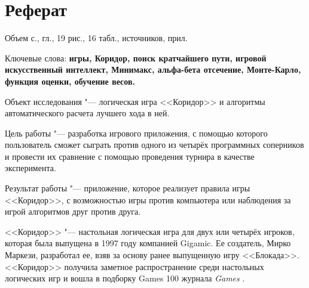 \documentclass[a4paper,12pt]{diplom}
\begin{document}

\maketitle

\chapter*{Реферат}

Объем  с.,  гл., 19 рис.,
16 табл.,  источников,  прил.

\medskip

Ключевые слова: \textbf{игры, Коридор, поиск кратчайшего пути, игровой искусственный интеллект, Минимакс, альфа-бета отсечение, Монте-Карло, функция оценки, обучение весов.}

\medskip

Объект исследования "--- логическая игра <<Коридор>> и алгоритмы автоматического расчета лучшего хода в ней.

Цель работы "--- разработка игрового приложения, с помощью которого пользователь сможет сыграть против одного из четырёх программных соперников и провести их сравнение с помощью проведения турнира в качестве эксперимента.

Результат работы "--- приложение, которое реализует правила игры <<Коридор>>, с возможностью игры против компьютера или наблюдения за игрой алгоритмов друг против друга.

\tableofcontents[Содержание]


<<Коридор>> "--- настольная логическая игра для двух или четырёх игроков, которая была выпущена в 1997 году компанией Gigamic. Ее создатель, Мирко Маркези, разработал ее, взяв за основу ранее выпущенную игру <<Блокада>>. <<Коридор>> получила заметное распространение среди настольных логических игр и вошла в подборку Games 100 журнала \textit{Games} \cite{games100}.
\end{document}
